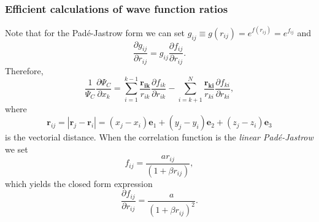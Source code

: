 \documentclass[compress]{beamer}
\renewcommand{\vec}[1]{\boldsymbol{#1}}
\newcommand{\bfv}[1]{\boldsymbol{#1}}                     %
\begin{document}
 {
   \frametitle{Efficient calculations of wave function ratios}
 \begin{small}
 {\scriptsize

Note that for the Pad\'e-Jastrow form we can set $g_{ij} \equiv g(r_{ij}) = e^{f(r_{ij})} = e^{f_{ij}}$ and 
\begin{equation}
\frac{\partial g_{ij}}{\partial r_{ij}} = g_{ij} \frac{\partial f_{ij}}{\partial r_{ij}}.
\end{equation}
Therefore, 
\begin{equation}\label{padeJastrowGradJasRatio}
\boxed{
\frac{1}{\Psi_{C}}\frac{\partial \Psi_{C}}{\partial x_k} =
\sum_{i=1}^{k-1}\frac{\bfv{r_{ik}}}{r_{ik}}\frac{\partial f_{ik}}{\partial r_{ik}}
-
\sum_{i=k+1}^{N}\frac{\bfv{r_{ki}}}{r_{ki}}\frac{\partial f_{ki}}{\partial r_{ki}},
}
\end{equation}
where 
\begin{equation}\label{distanceVector}
 \bfv{r}_{ij} = |\bfv{r}_j - \bfv{r}_i| = (x_j - x_i)\vec{e}_1 + (y_j - y_i)\vec{e}_2 + (z_j - z_i)\vec{e}_3
\end{equation}
is the vectorial distance. When the correlation function is the \emph{linear Pad\'e-Jastrow} we set \begin{equation}
f_{ij} = \frac{a r_{ij}}{(1 + \beta r_{ij})},
\end{equation}
which yields the closed form expression
\begin{equation}\label{analyticalPJGrad}
 \boxed{\frac{\partial f_{ij}}{\partial r_{ij}} = \frac{a}{(1 + \beta r_{ij})^2}}.
\end{equation}
 }
 \end{small}
 }
\end{document}
